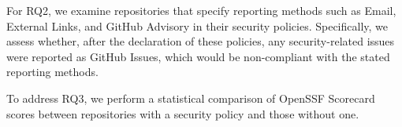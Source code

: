 






For RQ2, we examine repositories that specify reporting methods such as Email, External Links, and GitHub Advisory in their security policies. Specifically, we assess whether, after the declaration of these policies, any security-related issues were reported as GitHub Issues, which would be non-compliant with the stated reporting methods. 

To address RQ3, we perform a statistical comparison of OpenSSF Scorecard scores between repositories with a security policy and those without one.




